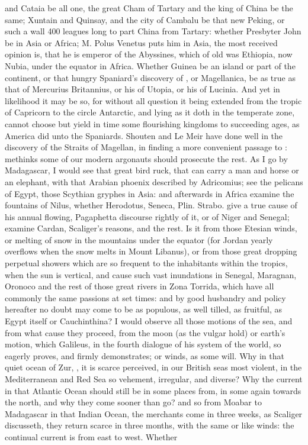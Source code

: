 {and Cataia be all one, the great Cham of Tartary and the king of China be the same; Xuntain and Quinsay, and the city of Cambalu be that new Peking, or such a wall 400 leagues long to part China from Tartary: whether Presbyter John be in Asia or Africa; M. Polus Venetus puts him in Asia, the most received opinion is, that he is emperor of the Abyssines, which of old was Ethiopia, now Nubia, under the equator in Africa. Whether Guinea be an island or part of the continent, or that hungry Spaniard's discovery of , or Magellanica, be as true as that of Mercurius Britannius, or his of Utopia, or his of Lucinia. And yet in likelihood it may be so, for without all question it being extended from the tropic of Capricorn to the circle Antarctic, and lying as it doth in the temperate zone, cannot choose but yield in time some flourishing kingdoms to succeeding ages, as America did unto the Spaniards. Shouten and Le Meir have done well in the discovery of the Straits of Magellan, in finding a more convenient passage to : methinks some of our modern argonauts should prosecute the rest. As I go by Madagascar, I would see that great bird ruck, that can carry a man and horse or an elephant, with that Arabian phoenix described by Adricomius; see the pelicans of Egypt, those Scythian gryphes in Asia: and afterwards in Africa examine the fountains of Nilus, whether Herodotus, Seneca, Plin.  Strabo.  give a true cause of his annual flowing, Pagaphetta discourse rightly of it, or of Niger and Senegal; examine Cardan, Scaliger's reasons, and the rest. Is it from those Etesian winds, or melting of snow in the mountains under the equator (for Jordan yearly overflows when the snow melts in Mount Libanus), or from those great dropping perpetual showers which are so frequent to the inhabitants within the tropics, when the sun is vertical, and cause such vast inundations in Senegal, Maragnan, Oronoco and the rest of those great rivers in Zona Torrida, which have all commonly the same passions at set times: and by good husbandry and policy hereafter no doubt may come to be as populous, as well tilled, as fruitful, as Egypt itself or Cauchinthina? I would observe all those motions of the sea, and from what cause they proceed, from the moon (as the vulgar hold) or earth's motion, which Galileus, in the fourth dialogue of his system of the world, so eagerly proves, and firmly demonstrates; or winds, as some will. Why in that quiet ocean of Zur, , it is scarce perceived, in our British seas most violent, in the Mediterranean and Red Sea so vehement, irregular, and diverse? Why the current in that Atlantic Ocean should still be in some places from, in some again towards the north, and why they come sooner than go? and so from Moabar to Madagascar in that Indian Ocean, the merchants come in three weeks, as Scaliger discusseth, they return scarce in three months, with the same or like winds: the continual current is from east to west. Whether }

